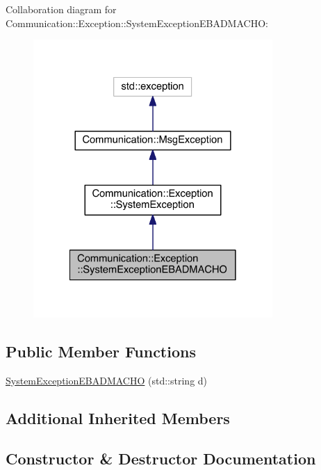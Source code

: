 Collaboration diagram for Communication\+:\+:Exception\+:\+:System\+Exception\+E\+B\+A\+D\+M\+A\+C\+H\+O\+:\nopagebreak
\begin{figure}[H]
\begin{center}
\leavevmode
\includegraphics[width=258pt]{class_communication_1_1_exception_1_1_system_exception_e_b_a_d_m_a_c_h_o__coll__graph}
\end{center}
\end{figure}
\subsection*{Public Member Functions}
\begin{DoxyCompactItemize}
\item 
\hyperlink{class_communication_1_1_exception_1_1_system_exception_e_b_a_d_m_a_c_h_o_aad0fd2c2e5288be0d8e60ed6faa9f9ae}{System\+Exception\+E\+B\+A\+D\+M\+A\+C\+H\+O} (std\+::string d)
\end{DoxyCompactItemize}
\subsection*{Additional Inherited Members}


\subsection{Constructor \& Destructor Documentation}
\hypertarget{class_communication_1_1_exception_1_1_system_exception_e_b_a_d_m_a_c_h_o_aad0fd2c2e5288be0d8e60ed6faa9f9ae}{}
